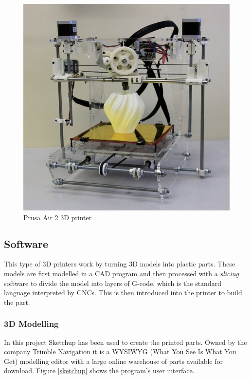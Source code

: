 		\begin{figure}[H]
				\centering
				\includegraphics[scale=0.4]{images/ProjectComponents/tia.jpg}
				\caption{Prusa Air 2 3D printer}
				\label{tia}
			\end{figure}
			\bigskip














\subsection{Software}
	This type of 3D printers work by turning 3D models into plastic parts. These models are first modelled in a CAD program and then processed with a \textit{slicing} software to divide the model into layers of G-code, which is the standard language interpreted by CNCs. This is then introduced into the printer to build the part.

		\subsubsection{3D Modelling }
		In this project Sketchup has been used to create the printed parts. Owned by the company Trimble Navigation it is a WYSIWYG (What You See Is What You Get) modelling editor with a large online warehouse of parts available for download. Figure \ref{sketchup} shows the program's user interface.\\

